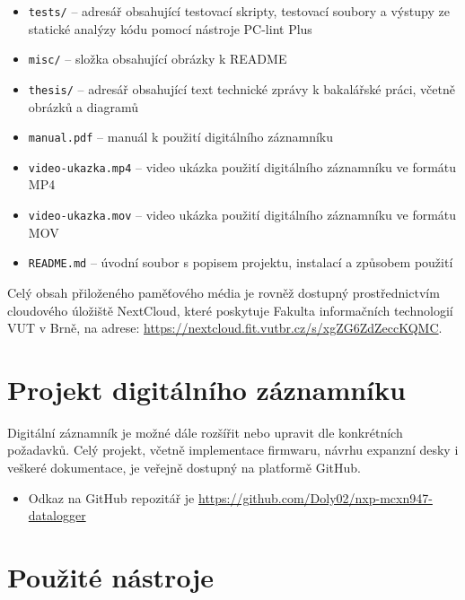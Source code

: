 \begin{itemize}
    \item \texttt{tests/} -- adresář obsahující testovací skripty, testovací soubory a výstupy ze statické analýzy kódu pomocí nástroje PC-lint Plus

    \item \texttt{misc/} -- složka obsahující obrázky k README

    \item \texttt{thesis/} -- adresář obsahující text technické zprávy k bakalářské práci, včetně obrázků a diagramů
    
    \item \texttt{manual.pdf} -- manuál k použití digitálního záznamníku
    \item \texttt{video-ukazka.mp4} -- video ukázka použití digitálního záznamníku ve formátu MP4
    \item \texttt{video-ukazka.mov} -- video ukázka použití digitálního záznamníku ve formátu MOV
    \item \texttt{README.md} -- úvodní soubor s popisem projektu, instalací a způsobem použití
\end{itemize}

Celý obsah přiloženého paměťového média je rovněž dostupný prostřednictvím cloudového úložiště NextCloud, které poskytuje Fakulta informačních technologií VUT v Brně, na adrese: \url{https://nextcloud.fit.vutbr.cz/s/xgZG6ZdZeccKQMC}.

\chapter{Projekt digitálního záznamníku}
Digitální záznamník je možné dále rozšířit nebo upravit dle konkrétních požadavků. Celý projekt, včetně implementace firmwaru, návrhu expanzní desky i veškeré dokumentace, je veřejně dostupný na platformě GitHub.

\begin{itemize}
    \item Odkaz na GitHub repozitář je \url{https://github.com/Doly02/nxp-mcxn947-datalogger}
\end{itemize}

\chapter{Použité nástroje}

